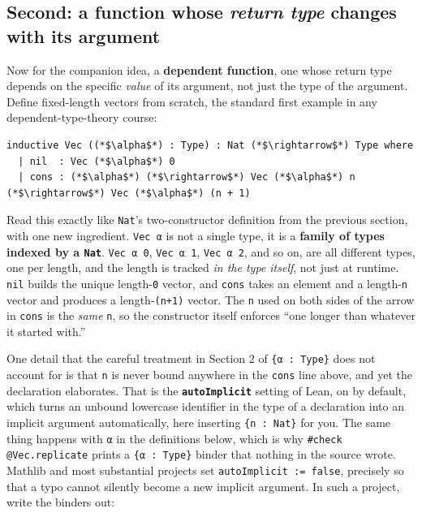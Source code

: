 \subsection{\texorpdfstring{Second: a function whose \emph{return type} changes with its argument}{Second: a function whose return type changes with its argument}}\label{sec:01-basics:03-dependent-types:4}

Now for the companion idea, a \textbf{dependent function}, one whose return type depends on the specific \emph{value} of its argument, not just the type of the argument. Define fixed-length vectors from scratch, the standard first example in any dependent-type-theory course:

\begin{lstlisting}
inductive Vec ((*$\alpha$*) : Type) : Nat (*$\rightarrow$*) Type where
  | nil  : Vec (*$\alpha$*) 0
  | cons : (*$\alpha$*) (*$\rightarrow$*) Vec (*$\alpha$*) n (*$\rightarrow$*) Vec (*$\alpha$*) (n + 1)
\end{lstlisting}

Read this exactly like \texttt{Nat}'s two-constructor definition from the previous section, with one new ingredient. \texttt{Vec α} is not a single type, it is a \textbf{family of types indexed by a \texttt{Nat}}. \texttt{Vec α 0}, \texttt{Vec α 1}, \texttt{Vec α 2}, and so on, are all different types, one per length, and the length is tracked \emph{in the type itself}, not just at runtime. \texttt{nil} builds the unique length-\texttt{0} vector, and \texttt{cons} takes an element and a length-\texttt{n} vector and produces a length-\texttt{(n+1)} vector. The \texttt{n} used on both sides of the arrow in \texttt{cons} is the \emph{same} \texttt{n}, so the constructor itself enforces ``one longer than whatever it started with.''

One detail that the careful treatment in Section 2 of \texttt{\{α : Type\}} does not account for is that \texttt{n} is never bound anywhere in the \texttt{cons} line above, and yet the declaration elaborates. That is the \textbf{\texttt{autoImplicit}} setting of Lean, on by default, which turns an unbound lowercase identifier in the type of a declaration into an implicit argument automatically, here inserting \texttt{\{n : Nat\}} for you. The same thing happens with \texttt{α} in the definitions below, which is why \texttt{\#check @Vec.replicate} prints a \texttt{\{α : Type\}} binder that nothing in the source wrote. Mathlib and most substantial projects set \texttt{autoImplicit := false}, precisely so that a typo cannot silently become a new implicit argument. In such a project, write the binders out:

